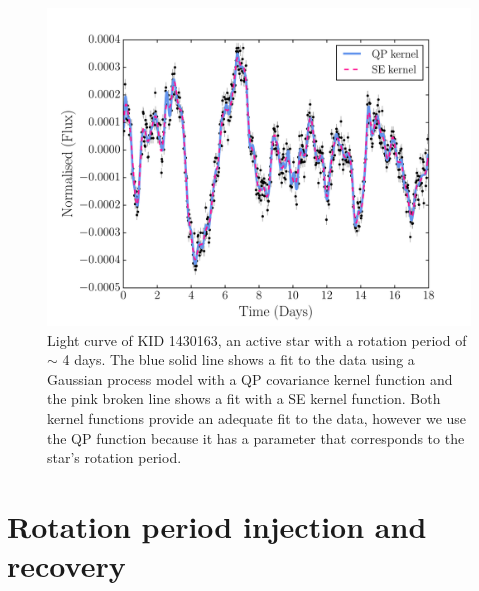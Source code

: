 
\begin{figure}
\begin{center}
\includegraphics[width=6in, clip=true]{figures/001430163.pdf}
\caption[A light curve with a GP model.]
{Light curve of KID 1430163, an active star with a rotation period of $\sim$ 4
days.
The blue solid line shows a fit to the data using
a Gaussian process model with a QP covariance kernel function and the pink
broken line shows a fit with a SE kernel function.
Both kernel functions provide an adequate fit to the data, however we use the
QP function because it has a parameter that corresponds to the star's
rotation period.}
\label{fig:GP_example}
\end{center}
\end{figure}

\section{Rotation period injection and recovery}

